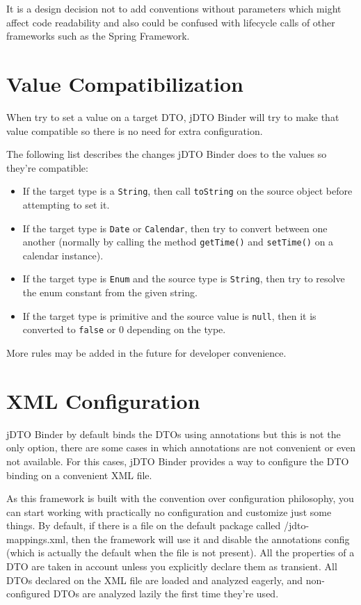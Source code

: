 \documentclass[11pt]{article}
\newcommand{\JDTO}{jDTO Binder\xspace}
\newcommand{\DEFAULTCONFIG}{/jdto-mappings.xml\xspace}
\begin{document}
It is a design decision not to add conventions without parameters which might affect code readability and also could be confused with lifecycle calls of other frameworks such as the Spring Framework.

\clearpage

\section{Value Compatibilization}

When try to set a value on a target DTO, \JDTO will try to make that value compatible so there is no need for extra configuration.

The following list describes the changes \JDTO does to the values so they're compatible:

\begin{itemize}
\item If the target type is a \texttt{String}, then call \texttt{toString} on the source object before attempting to set it.
\item If the target type is \texttt{Date} or \texttt{Calendar}, then try to convert between one another (normally by calling the method \texttt{getTime()} and \texttt{setTime()} on a calendar instance). 
\item If the target type is \texttt{Enum} and the source type is \texttt{String}, then try to resolve the enum constant from the given string.
\item If the target type is primitive and the source value is \texttt{null}, then it is converted to \texttt{false} or 0 depending on the type.
\end{itemize}

More rules may be added in the future for developer convenience.

\clearpage


\section{XML Configuration}

\JDTO by default binds the DTOs using annotations but this is not the only option, there are some cases in which annotations are not convenient or even not available. For this cases, \JDTO provides a way to configure the DTO binding on a convenient XML file.

As this framework is built with the convention over configuration philosophy, you can start working with practically no configuration and customize just some things. By default, if there is a file on the default package called \DEFAULTCONFIG, then the framework will use it and disable the annotations config (which is actually the default when the file is not present). All the properties of a DTO are taken in account unless you explicitly declare them as transient. All DTOs declared on the XML file are loaded and analyzed eagerly, and non-configured DTOs are analyzed lazily the first time they're used.
\end{document}

